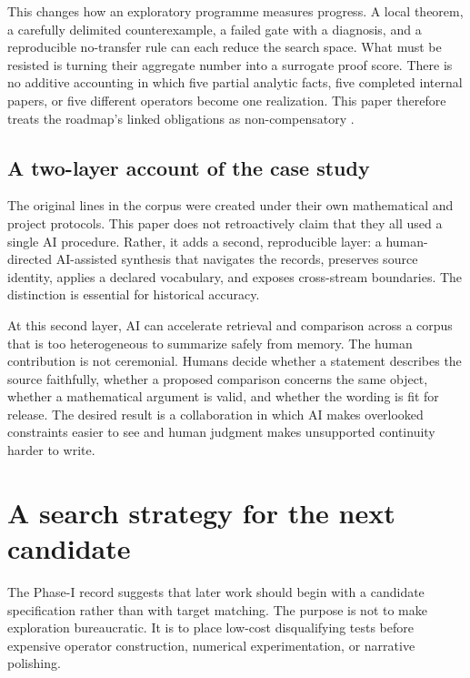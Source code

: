 This changes how an exploratory programme measures progress. A local theorem, a carefully delimited counterexample, a failed gate with a diagnosis, and a reproducible no-transfer rule can each reduce the search space. What must be resisted is turning their aggregate number into a surrogate proof score. There is no additive accounting in which five partial analytic facts, five completed internal papers, or five different operators become one realization. This paper therefore treats the roadmap's linked obligations as non-compensatory .

\hypertarget{a-two-layer-account-of-the-case-study}{%
\subsection{A two-layer account of the case study}\label{a-two-layer-account-of-the-case-study}}

The original lines in the corpus were created under their own mathematical and project protocols. This paper does not retroactively claim that they all used a single AI procedure. Rather, it adds a second, reproducible layer: a human-directed AI-assisted synthesis that navigates the records, preserves source identity, applies a declared vocabulary, and exposes cross-stream boundaries. The distinction is essential for historical accuracy.

At this second layer, AI can accelerate retrieval and comparison across a corpus that is too heterogeneous to summarize safely from memory. The human contribution is not ceremonial. Humans decide whether a statement describes the source faithfully, whether a proposed comparison concerns the same object, whether a mathematical argument is valid, and whether the wording is fit for release. The desired result is a collaboration in which AI makes overlooked constraints easier to see and human judgment makes unsupported continuity harder to write.

\hypertarget{a-search-strategy-for-the-next-candidate}{%
\section{A search strategy for the next candidate}\label{a-search-strategy-for-the-next-candidate}}

The Phase-I record suggests that later work should begin with a candidate specification rather than with target matching. The purpose is not to make exploration bureaucratic. It is to place low-cost disqualifying tests before expensive operator construction, numerical experimentation, or narrative polishing.

